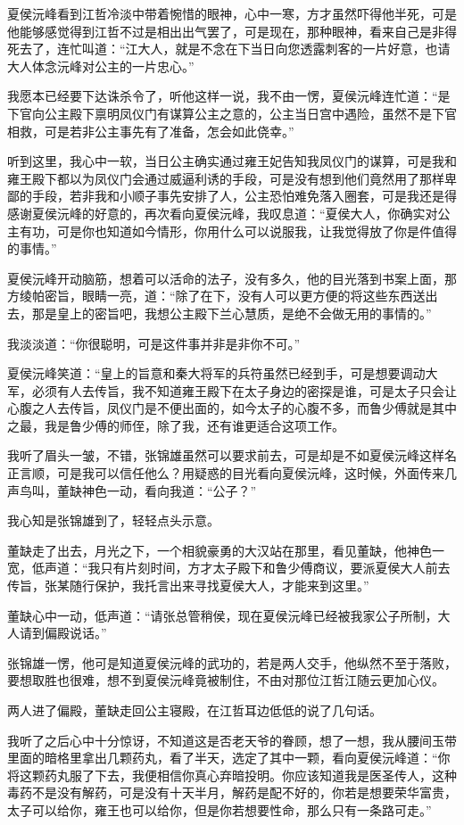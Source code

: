 夏侯沅峰看到江哲冷淡中带着惋惜的眼神，心中一寒，方才虽然吓得他半死，可是他能够感觉得到江哲不过是相出出气罢了，可是现在，那种眼神，看来自己是非得死去了，连忙叫道：“江大人，就是不念在下当日向您透露刺客的一片好意，也请大人体念沅峰对公主的一片忠心。”

我愿本已经要下达诛杀令了，听他这样一说，我不由一愣，夏侯沅峰连忙道：“是下官向公主殿下禀明凤仪门有谋算公主之意的，公主当日宫中遇险，虽然不是下官相救，可是若非公主事先有了准备，怎会如此侥幸。”

听到这里，我心中一软，当日公主确实通过雍王妃告知我凤仪门的谋算，可是我和雍王殿下都以为凤仪门会通过威逼利诱的手段，可是没有想到他们竟然用了那样卑鄙的手段，若非我和小顺子事先安排了人，公主恐怕难免落入圈套，可是我还是得感谢夏侯沅峰的好意的，再次看向夏侯沅峰，我叹息道：“夏侯大人，你确实对公主有功，可是你也知道如今情形，你用什么可以说服我，让我觉得放了你是件值得的事情。”

夏侯沅峰开动脑筋，想着可以活命的法子，没有多久，他的目光落到书案上面，那方绫帕密旨，眼睛一亮，道：“除了在下，没有人可以更方便的将这些东西送出去，那是皇上的密旨吧，我想公主殿下兰心慧质，是绝不会做无用的事情的。”

我淡淡道：“你很聪明，可是这件事并非是非你不可。”

夏侯沅峰笑道：“皇上的旨意和秦大将军的兵符虽然已经到手，可是想要调动大军，必须有人去传旨，我不知道雍王殿下在太子身边的密探是谁，可是太子只会让心腹之人去传旨，凤仪门是不便出面的，如今太子的心腹不多，而鲁少傅就是其中之最，我是鲁少傅的师侄，除了我，还有谁更适合这项工作。

我听了眉头一皱，不错，张锦雄虽然可以要求前去，可是却是不如夏侯沅峰这样名正言顺，可是我可以信任他么？用疑惑的目光看向夏侯沅峰，这时候，外面传来几声鸟叫，董缺神色一动，看向我道：“公子？”

我心知是张锦雄到了，轻轻点头示意。

董缺走了出去，月光之下，一个相貌豪勇的大汉站在那里，看见董缺，他神色一宽，低声道：“我只有片刻时间，方才太子殿下和鲁少傅商议，要派夏侯大人前去传旨，张某随行保护，我托言出来寻找夏侯大人，才能来到这里。”

董缺心中一动，低声道：“请张总管稍侯，现在夏侯沅峰已经被我家公子所制，大人请到偏殿说话。”

张锦雄一愣，他可是知道夏侯沅峰的武功的，若是两人交手，他纵然不至于落败，要想取胜也很难，想不到夏侯沅峰竟被制住，不由对那位江哲江随云更加心仪。

两人进了偏殿，董缺走回公主寝殿，在江哲耳边低低的说了几句话。

我听了之后心中十分惊讶，不知道这是否老天爷的眷顾，想了一想，我从腰间玉带里面的暗格里拿出几颗药丸，看了半天，选定了其中一颗，看向夏侯沅峰道：“你将这颗药丸服了下去，我便相信你真心弃暗投明。你应该知道我是医圣传人，这种毒药不是没有解药，可是没有十天半月，解药是配不好的，你若是想要荣华富贵，太子可以给你，雍王也可以给你，但是你若想要性命，那么只有一条路可走。”

